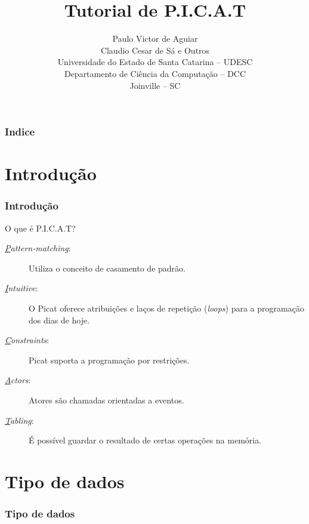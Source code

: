 \documentclass[sans]{beamer}
\title[Tutorial de P.I.C.A.T]{Tutorial de P.I.C.A.T}
\author[Paulo, Claudio, Lu]{Paulo Victor de Aguiar\\
	Claudio Cesar de Sá e Outros\\ 
	Universidade do Estado de Santa Catarina -- UDESC\\
	Departamento de Ciência da Computação -- DCC\\
	Joinville -- SC}
\begin{document}
\begin{frame}[fragile]   %
\maketitle
\end{frame}


\begin{frame}[fragile]   %
\frametitle{Indice}
\tableofcontents
\end{frame}


\section{Introdução}
\begin{frame}[fragile]   %
\frametitle{Introdução}
\begin{block}{O que é P.I.C.A.T?}
 \begin{description}
 \item [\textit{\underline{P}attern-matching}:] Utiliza o conceito de casamento de padrão. 
  
 \item [\textit{\underline{I}ntuitive}:] O Picat oferece atribuições e laços de repetição (\textit{loops}) para a programação dos dias de hoje.
 
 \item [\textit{\underline{C}onstraints}:] Picat suporta a programação por restrições.
 
 \item [\textit{\underline{A}ctors}:] Atores são chamadas orientadas a eventos.
 
 \item [\textit{\underline{T}abling}:] É possível guardar o resultado de certas operações na memória.
 
 \end{description}
\end{block}
\end{frame}


\section{Tipo de dados}
\begin{frame}[fragile]   %
\frametitle{Tipo de dados}

\end{frame}
\end{document}
